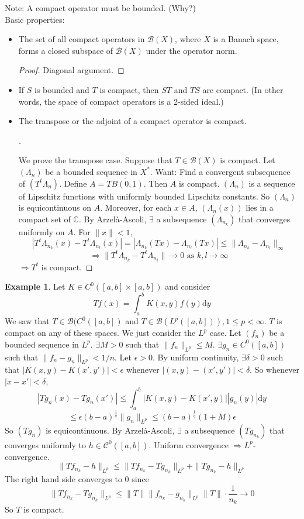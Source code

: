 \documentclass{article}
\theoremstyle{definition}
\newtheorem{ex}{Example}
\newenvironment{proofs}[1][\proofname]{%
  \begin{proof}[#1]$ $\par\nobreak\ignorespaces
}{%
  \end{proof}
}
\newcommand{\B}{\mathcal B}
\newcommand{\C}{\mathcal C}
\newcommand{\CC}{\mathbb C}
\begin{document}
Note: A compact operator must be bounded. (Why?)\\
Basic properties:
\begin{itemize}
	\item The set of all compact operators in $\B(X)$, where $X$ is a Banach space, forms a closed subspace of $\B(X)$ under the operator norm.
		\begin{proof}
			Diagonal argument.
		\end{proof}

	\item If $S$ is bounded and $T$ is compact, then $ST$ and $TS$ are compact.
		(In other words, the space of compact operators is a 2-sided ideal.)

	\item The transpose or the adjoint of a compact operator is compact.
		\begin{proofs}
			We prove the transpose case.
			Suppose that $T \in \B(X)$ is compact.
			Let $(\Lambda_n)$ be a bounded sequence in $X^*$.
			Want: Find a convergent subsequence of $(T^t \Lambda_n)$.
			Define $A = \overline{T B(0, 1)}$.
			Then $A$ is compact.
			$(\Lambda_n)$ is a sequence of Lipschitz functions with uniformly bounded Lipschitz constants.
			So $(\Lambda_n)$ is equicontinuous on $A$.
			Moreover, for each $x \in A$, $(\Lambda_n(x))$ lies in a compact set of $\CC$.
			By Arzel\`a-Ascoli, $\exists$ a subsequence $(\Lambda_{n_k})$ that converges uniformly on $A$.
			For $\|x\| < 1$, 
			\[
				| T^t \Lambda_{n_k} (x) - T^t \Lambda_{n_l}(x)| = |\Lambda_{n_k} (T x) - \Lambda_{n_l} (T x)| \leq \|\Lambda_{n_k} - \Lambda_{n_l}\|_\infty
			\]
			\[
				\Rightarrow \|T^t \Lambda_{n_k} - T^t \Lambda_{n_l}\| \to 0 \text{ as }k, l \to \infty
			\]
			$\Rightarrow T^t$ is compact.
		\end{proofs}
\end{itemize}

\begin{ex}
	Let $K \in C^0([a, b] \times [a, b])$ and consider 
	\[
		T f(x) = \int_a^b K(x, y) f(y) \mathrm{d} y
	\]
	We saw that $T \in \B(C^0([a, b])$ and $T \in \B(L^p([a, b])), 1 \leq p < \infty$.
	$T$ is compact on any of these spaces.
	We just consider the $L^p$ case.
	Let $(f_n)$ be a bounded sequence in $L^p$.
	$\exists M > 0$ such that $\|f_n\|_{L^p} \leq M$.
	$\exists g_n \in C^0([a, b])$ such that $\|f_n - g_n\|_{L^p} < 1/n$.
	Let $\epsilon > 0$.
	By uniform continuity, $\exists \delta > 0$ such that $|K(x, y) - K(x', y')| < \epsilon$ whenever $|(x, y) - (x', y')| < \delta$.
	So whenever $|x - x'| < \delta$, 
	\[
		|T g_n(x) - T g_n(x')| \leq \int_a^b |K(x, y) - K(x', y)| |g_n(y)| \mathrm{d} y
	\]
	\[
		\leq \epsilon (b - a)^{\frac{1}{q}} \|g_n\|_{L^p} \leq (b - a)^{\frac{1}{q}} (1 + M)\epsilon
	\]
	So $(T g_n)$ is equicontinuous.
	By Arzel\`a-Ascoli, $\exists$ a subsequence $(T g_{n_k})$ that converges uniformly to $h \in \C^0([a, b])$.
	Uniform convergence $\Rightarrow L^p$-convergence.
	\[
		\|T f_{n_k} - h\|_{L^p} \leq \|T f_{n_k} - T g_{n_k}\|_{L^p} + \|T g_{n_k} - h \|_{L^p} 
	\]
	The right hand side converges to 0 since
	\[
		\|T f_{n_k} - T g_{n_k}\|_{L^p} \leq \|T\|\|f_{n_k} - g_{n_k}\|_{L^p}  \|T\| \cdot \frac{1}{n_k} \to 0
	\]
	So $T$ is compact.
\end{ex}
\end{document}
